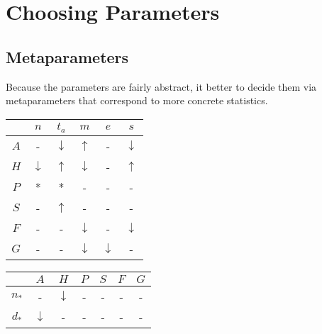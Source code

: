 \section{Choosing Parameters}\label{sec:params}


\subsection{Metaparameters}\label{sec:metaparams}

Because the parameters are fairly abstract,
it better to decide them via metaparameters
that correspond to more concrete statistics.

\begin{table}
\begin{tabular}{c|c|c|c|c|c}
        &   $n$             &   $t_a$           &   $m$             &   $e$             &   $s$             \\
    \hline
    $A$ &   -               &   $\downarrow$    &   $\uparrow$      &   -               &   $\downarrow$    \\
    $H$ &   $\downarrow$    &   $\uparrow$      &   $\downarrow$    &   -               &   $\uparrow$      \\
    $P$ &   *               &   *               &   -               &   -               &   -               \\
    $S$ &   -               &   $\uparrow$      &   -               &   -               &   -               \\
    $F$ &   -               &   -               &   $\downarrow$    &   -               &   $\downarrow$    \\
    $G$ &   -               &   -               &   $\downarrow$    &   $\downarrow$    &   -
\end{tabular}
\end{table}

\begin{table}
\begin{tabular}{c|c|c|c|c|c|c}
            &   $A$             &   $H$             &   $P$ &   $S$ &   $F$ &   $G$ \\
    \hline
    $n_*$   &   -               &   $\downarrow$    &   -   &   -   &   -   &   -   \\
    $d_*$   &   $\downarrow$    &   -               &   -   &   -   &   -   &   -
\end{tabular}
\end{table}

